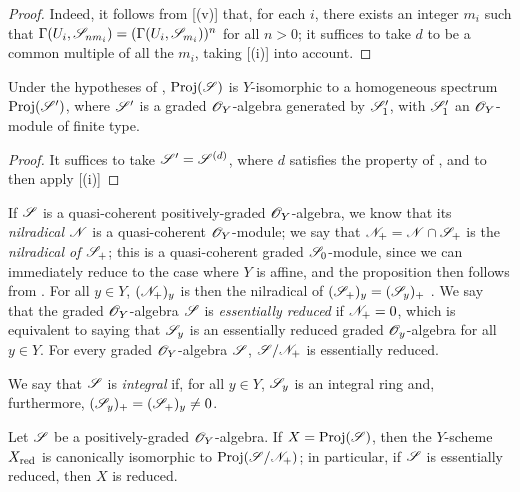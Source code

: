 \begin{proof}
Indeed, it follows from [(v)] that, for each $i$, there exists an integer $m_i$ such that $\Gamma(U_i,\mathscr{S}_{nm_i})=(\Gamma(U_i,\mathscr{S}_{m_i}))^n$ for all $n>0$;
it suffices to take $d$ to be a common multiple of all the $m_i$, taking [(i)] into account.
\end{proof}

\begin{corollary}[3.1.11]
\label{II.3.1.11}
Under the hypotheses of , $\operatorname{Proj}(\mathscr{S})$ is $Y$-isomorphic to a homogeneous spectrum $\operatorname{Proj}(\mathscr{S}')$, where $\mathscr{S}'$ is a graded $\mathscr{O}_Y$-algebra generated by $\mathscr{S}'_1$, with $\mathscr{S}'_1$ an $\mathscr{O}_Y$-module of finite type.
\end{corollary}

\begin{proof}
It suffices to take $\mathscr{S}'=\mathscr{S}^{(d)}$, where $d$ satisfies the property of , and to then apply [(i)]
\end{proof}

\begin{env}[3.1.12]
\label{II.3.12}
If $\mathscr{S}$ is a quasi-coherent positively-graded $\mathscr{O}_Y$-algebra, we know  that its \emph{nilradical} $\mathscr{N}$ is a quasi-coherent $\mathscr{O}_Y$-module;
we say that $\mathscr{N}_+=\mathscr{N}\cap\mathscr{S}_+$ is the \emph{nilradical of $\mathscr{S}_+$};
this is a quasi-coherent graded $\mathscr{S}_0$-module, since we can immediately reduce to the case where $Y$ is affine, and the proposition then follows from .
For all $y\in Y$, $(\mathscr{N}_+)_y$ is then the nilradical of $(\mathscr{S}_+)_y=(\mathscr{S}_y)_+$ .
We say that the graded $\mathscr{O}_Y$-algebra $\mathscr{S}$ is \emph{essentially reduced} if $\mathscr{N}_+=0$, which is equivalent
to saying that $\mathscr{S}_y$ is an essentially reduced graded $\mathscr{O}_y$-algebra for all $y\in Y$.
For every graded $\mathscr{O}_Y$-algebra $\mathscr{S}$, $\mathscr{S}/\mathscr{N}_+$ is essentially reduced.

We say that $\mathscr{S}$ is \emph{integral} if, for all $y\in Y$, $\mathscr{S}_y$ is an integral ring and, furthermore, $(\mathscr{S}_y)_+=(\mathscr{S}_+)_y\neq0$.
\end{env}

\begin{proposition}[3.1.13]
\label{II.3.1.13}
Let $\mathscr{S}$ be a positively-graded $\mathscr{O}_Y$-algebra.
If $X=\operatorname{Proj}(\mathscr{S})$, then the $Y$-scheme $X_{\mathrm{red}}$ is canonically isomorphic to $\operatorname{Proj}(\mathscr{S}/\mathscr{N}_+)$;
in particular, if $\mathscr{S}$ is essentially reduced, then $X$ is reduced.
\end{proposition}

